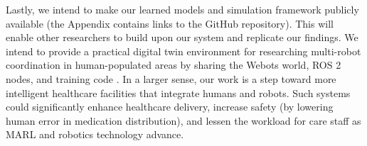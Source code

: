 \documentclass[conference]{IEEEtran}
\begin{document}
Lastly, we intend to make our learned models and simulation framework publicly available (the Appendix contains links to the GitHub repository). This will enable other researchers to build upon our system and replicate our findings. We intend to provide a practical digital twin environment for researching multi-robot coordination in human-populated areas by sharing the Webots world, ROS 2 nodes, and training code \citep{ztouni2021, salinas2023}. In a larger sense, our work is a step toward more intelligent healthcare facilities that integrate humans and robots. Such systems could significantly enhance healthcare delivery, increase safety (by lowering human error in medication distribution), and lessen the workload for care staff as MARL and robotics technology advance.


\end{document}
